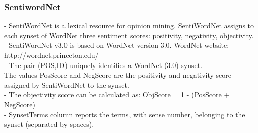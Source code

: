 \documentclass{beamer}
\begin{document}
\begin{frame}
\frametitle{SentiwordNet}


- SentiWordNet is a lexical resource for opinion mining. SentiWordNet
assigns to each synset of WordNet three sentiment scores: positivity,
negativity, objectivity. \\

- SentiWordNet v3.0 is based on WordNet version 3.0.
 WordNet website: http://wordnet.princeton.edu/ \\

- The pair (POS,ID) uniquely identifies a WordNet (3.0) synset.\\
 The values PosScore and NegScore are the positivity and negativity
 score assigned by SentiWordNet to the synset. \\
- The objectivity score can be calculated as:
 ObjScore = 1 - (PosScore + NegScore) \\
- SynsetTerms column reports the terms, with sense number, belonging
 to the synset (separated by spaces).

\end{frame}
\end{document}
